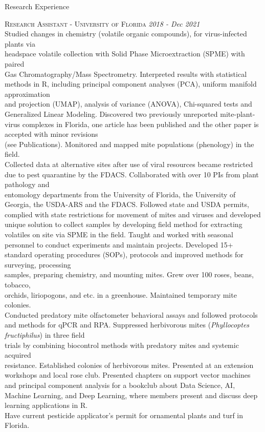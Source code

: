\documentclass{resume} %
\begin{document}
\newpage

\begin{rSection}{Research Experience}

\textsc{Research Assistant - University of Florida} \hfill {\em \textit{2018 - Dec 2021}}\\
Studied changes in chemistry (volatile organic compounds), for virus-infected plants via\\ headspace volatile collection with Solid Phase Microextraction (SPME) with paired\\
Gas Chromatography/Mass Spectrometry. Interpreted results with statistical methods in R, including principal component analyses (PCA), uniform manifold approximation\\
and projection (UMAP), analysis of variance (ANOVA), Chi-squared tests and Generalized Linear Modeling. Discovered two previously unreported mite-plant-virus complexes in Florida, one article has been published and the other paper is accepted with minor revisions\\ (see Publications). Monitored and mapped mite populations (phenology) in the field.\\
Collected data at alternative sites after use of viral resources became restricted due to pest quarantine by the FDACS. Collaborated with over 10 PIs from plant pathology and\\
entomology departments from the University of Florida, the University of Georgia, the USDA-ARS and the FDACS. Followed state and USDA permits, complied with state restrictions for movement of mites and viruses and developed unique solution to collect samples by developing field method for extracting volatiles on site via SPME in the field. Taught and worked with seasonal personnel to conduct experiments and maintain projects. Developed 15+ standard operating procedures (SOPs), protocols and improved methods for surveying, processing\\
samples, preparing chemistry, and mounting mites. Grew over 100 roses, beans, tobacco,\\ orchids, liriopogons, and etc. in a greenhouse. Maintained temporary mite colonies.\\
Conducted predatory mite olfactometer behavioral assays and followed
protocols and methods for qPCR and RPA.  Suppressed herbivorous mites (\textit{Phyllocoptes fructiphilus}) in three field\\
trials by combining biocontrol methods with predatory mites and systemic acquired\\ resistance. Established colonies of herbivorous mites. Presented at an extension workshops and local rose club. Presented chapters on support vector machines and principal component analysis for a bookclub about Data Science, AI, Machine Learning, and Deep Learning, where members present and discuss deep learning applications in R.\\
Have current pesticide applicator's permit for ornamental plants and turf in Florida.
\hfill


\end{rSection}
\end{document}
